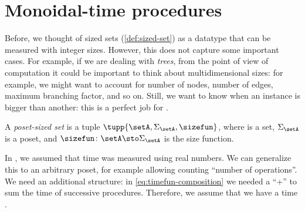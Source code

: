 \section{Monoidal-time procedures}
\label{sec:ProcMod}



Before, we thought of sized sets (\cref{def:sized-set}) as a datatype that can be measured with integer sizes.
However, this does not capture some important cases.
For example, if we are dealing with \emph{trees}, from the point of view of computation it could be important to think about multidimensional sizes: for example, we might want to account for number of nodes, number of edges, maximum branching factor, and so on.
Still, we want to know when an instance is bigger than another: this is a perfect job for .

\begin{definition}
    \label{def:poset-sized-set}
    A \emph{poset-sized set} is a tuple $\tupp{\setA, \Sigma_{\setA}, \sizefun}$, where \setA is a set, $\Sigma_\setA$ is a poset, and  $\sizefun \colon \setA \sto \Sigma_\setA$ is the size function.
\end{definition}

In \ProcSizeTime, we assumed that time was measured using real numbers.
We can generalize this to an arbitrary poset, for example allowing counting ``number of operations''.
We need an additional structure: in \vref{eq:timefun-composition} we needed a ``+'' to sum the time of successive procedures.
Therefore, we assume that we have a time  \TimeMonoidal.

